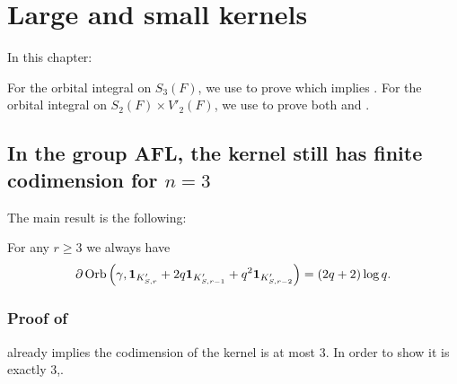 \chapter{Large and small kernels}
\label{ch:ker}

In this chapter:
\begin{itemize}
  \ii For the orbital integral on $S_3(F)$,
  we use  to prove  which implies .
  \ii For the orbital integral on $S_2(F) \times V'_2(F)$,
  we use  to prove
  both  and .
\end{itemize}

\section{In the group AFL, the kernel still has finite codimension for $n=3$}
The main result is the following:
\begin{theorem}
  \label{thm:large_kernel_group_full}
  For any $r \ge 3$ we always have
  \[ \partial \operatorname{Orb}\left(\gamma, \mathbf{1}_{K'_{S, r}} + 2q \mathbf{1}_{K'_{S, r-1}}
    + q^2 \mathbf{1}_{K'_{S, r-2}}\right) = (2q+2) \log q. \]
\end{theorem}

\subsection{Proof of }
 already implies the codimension of the kernel is at most $3$.
In order to show it is exactly $3$,.

